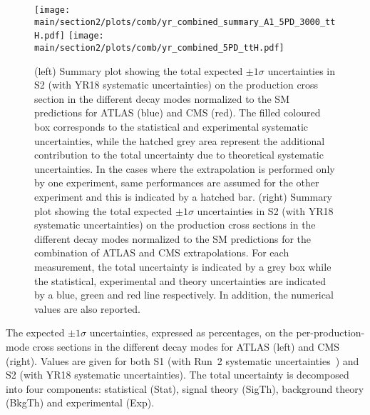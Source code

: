 \begin{figure}[hbtp]
\centering
\texttt{[image: \\main/section2/plots/comb/yr\_combined\_summary\_A1\_5PD\_3000\_ttH.pdf]}%
\texttt{[image: \\main/section2/plots/comb/yr\_combined\_5PD\_ttH.pdf]}
\caption{(left) Summary plot showing the total expected $\pm 1\sigma$ uncertainties in S2 (with YR18 systematic uncertainties) on the \tth production cross section in the different decay modes normalized to the SM predictions   for ATLAS (blue)  and CMS (red). The filled coloured box corresponds to the statistical and experimental systematic uncertainties, while the hatched grey area represent the additional contribution to the total uncertainty due to theoretical systematic uncertainties. In the cases where  the extrapolation is performed only by one experiment, same performances are assumed for the other experiment and this is indicated by a  hatched bar.
(right) Summary plot showing the total expected $\pm 1\sigma$  uncertainties in S2 (with YR18 systematic uncertainties) on the \tth production cross sections in the different decay modes normalized to the SM predictions for the combination of ATLAS and CMS extrapolations. For each measurement,  the total uncertainty is indicated by a grey box while the statistical, experimental and theory uncertainties are indicated by a blue, green and red line respectively. In addition, the numerical values are also reported.}
\label{fig:summary_A1_5PD_ttH}
\end{figure}


\begin{table}[hbtp]
\centering
\caption{The expected $\pm 1\sigma$ uncertainties, expressed as percentages, on the per-production-mode cross sections in the different decay modes  for ATLAS (left) and CMS (right). Values are given for both S1 (with Run~2 systematic uncertainties~\cite{Sirunyan:2018koj}) and S2 (with YR18 systematic uncertainties). The total uncertainty is decomposed into four components: statistical (Stat), signal theory (SigTh), background theory (BkgTh) and experimental (Exp).}
\scriptsize	
\hspace{0.5cm}

\label{tab:summary_A1_5PD}
\vspace{0.5cm}
\end{table}



